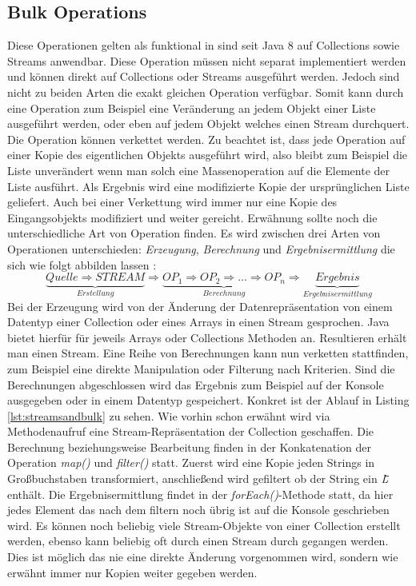 \subsection{Bulk Operations}
Diese Operationen gelten als funktional in sind seit Java 8 auf Collections sowie Streams anwendbar. Diese Operation müssen nicht separat implementiert werden und können direkt auf Collections oder Streams ausgeführt werden. Jedoch sind nicht zu beiden Arten die exakt gleichen Operation verfügbar. Somit kann durch eine Operation zum Beispiel eine Veränderung an jedem Objekt einer Liste ausgeführt werden, oder eben auf jedem Objekt welches einen Stream durchquert. Die Operation können verkettet werden. Zu beachtet ist, dass jede Operation auf einer Kopie des eigentlichen Objekts ausgeführt wird, also bleibt zum Beispiel die Liste unverändert wenn man solch eine Massenoperation auf die Elemente der Liste ausführt. Als Ergebnis wird eine modifizierte Kopie der ursprünglichen Liste geliefert. Auch bei einer Verkettung wird immer nur eine Kopie des Eingangsobjekts modifiziert und weiter gereicht. Erwähnung sollte noch die unterschiedliche Art von Operation finden. Es wird zwischen drei Arten von Operationen unterschieden: \textit{Erzeugung}, \textit{Berechnung} und \textit{Ergebnisermittlung} die sich wie folgt abbilden lassen \cite{Inden.2015} : 
\begin{displaymath}
	\underbrace{Quelle \Rightarrow STREAM}_{Erstellung} \Rightarrow \underbrace{OP_{1} \Rightarrow OP_{2} \Rightarrow ... \Rightarrow OP_{n}}_{Berechnung} \Rightarrow \underbrace{Ergebnis}_{Ergebnisermittlung}
\end{displaymath}
Bei der Erzeugung wird von der Änderung der Datenrepräsentation von einem Datentyp einer Collection oder eines Arrays in einen Stream gesprochen. Java bietet hierfür für jeweils Arrays oder Collections Methoden an. Resultieren erhält man einen Stream. Eine Reihe von Berechnungen kann nun verketten stattfinden, zum Beispiel eine direkte Manipulation oder Filterung nach Kriterien. Sind die Berechnungen abgeschlossen wird das Ergebnis zum Beispiel auf der Konsole ausgegeben oder in einem Datentyp gespeichert. Konkret ist der Ablauf in Listing \ref{lst:streamsandbulk} zu sehen. Wie vorhin schon erwähnt wird via Methodenaufruf eine Stream-Repräsentation der Collection geschaffen. Die Berechnung beziehungsweise Bearbeitung finden in der Konkatenation der Operation \textit{map()} und \textit{filter()} statt. Zuerst wird eine Kopie jeden Strings in Großbuchstaben transformiert, anschließend wird gefiltert ob der String ein \textit{\"L\"} enthält. Die Ergebnisermittlung findet in der \textit{forEach()}-Methode statt, da hier jedes Element das nach dem filtern noch übrig ist auf die Konsole geschrieben wird. Es können noch beliebig viele Stream-Objekte von einer Collection erstellt werden, ebenso kann beliebig oft durch einen Stream durch gegangen werden. Dies ist möglich das nie eine direkte Änderung vorgenommen wird, sondern wie erwähnt immer nur Kopien weiter gegeben werden.
